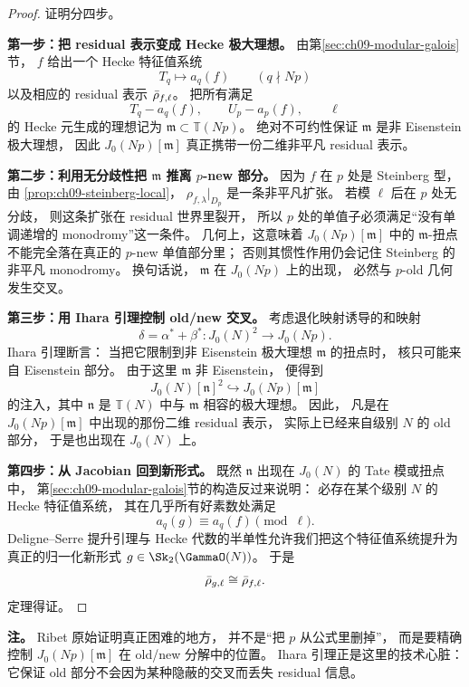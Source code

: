 \begin{proof}
证明分四步。

\textbf{第一步：把 residual 表示变成 Hecke 极大理想。}
由第\ref{sec:ch09-modular-galois}节，
$f$ 给出一个 Hecke 特征值系统
\[
  T_q\mapsto a_q(f)
  \qquad (q\nmid Np)
\]
以及相应的 residual 表示 $\bar{\rho}_{f,\ell}$。
把所有满足
\[
  T_q-a_q(f),\qquad U_p-a_p(f),\qquad \ell
\]
的 Hecke 元生成的理想记为 $\mathfrak m\subset \mathbb T(Np)$。
绝对不可约性保证 $\mathfrak m$ 是非 Eisenstein 极大理想，
因此 $J_0(Np)[\mathfrak m]$ 真正携带一份二维非平凡 residual 表示。

\textbf{第二步：利用无分歧性把 $\mathfrak m$ 推离 $p$-new 部分。}
因为 $f$ 在 $p$ 处是 Steinberg 型，
由 \cref{prop:ch09-steinberg-local}，
$\rho_{f,\lambda}|_{D_p}$ 是一条非平凡扩张。
若模 $\ell$ 后在 $p$ 处无分歧，
则这条扩张在 residual 世界里裂开，
所以 $p$ 处的单值子必须满足“没有单调递增的 monodromy”这一条件。
几何上，这意味着 $J_0(Np)[\mathfrak m]$ 中的 $\mathfrak m$-扭点不能完全落在真正的 $p$-new 单值部分里；
否则其惯性作用仍会记住 Steinberg 的非平凡 monodromy。
换句话说，
$\mathfrak m$ 在 $J_0(Np)$ 上的出现，
必然与 $p$-old 几何发生交叉。

\textbf{第三步：用 Ihara 引理控制 old/new 交叉。}
考虑退化映射诱导的和映射
\[
  \delta=\alpha^*+\beta^*\colon J_0(N)^2\to J_0(Np).
\]
Ihara 引理断言：
当把它限制到非 Eisenstein 极大理想 $\mathfrak m$ 的扭点时，
核只可能来自 Eisenstein 部分。
由于这里 $\mathfrak m$ 非 Eisenstein，
便得到
\[
  J_0(N)[\mathfrak n]^2\hookrightarrow J_0(Np)[\mathfrak m]
\]
的注入，其中 $\mathfrak n$ 是 $\mathbb T(N)$ 中与 $\mathfrak m$ 相容的极大理想。
因此，
凡是在 $J_0(Np)[\mathfrak m]$ 中出现的那份二维 residual 表示，
实际上已经来自级别 $N$ 的 old 部分，
于是也出现在 $J_0(N)$ 上。

\textbf{第四步：从 Jacobian 回到新形式。}
既然 $\mathfrak n$ 出现在 $J_0(N)$ 的 Tate 模或扭点中，
第\ref{sec:ch09-modular-galois}节的构造反过来说明：
必存在某个级别 $N$ 的 Hecke 特征值系统，
其在几乎所有好素数处满足
\[
  a_q(g)\equiv a_q(f)\pmod \ell.
\]
Deligne--Serre 提升引理与 Hecke 代数的半单性允许我们把这个特征值系统提升为真正的归一化新形式 $g\in \Sk_2(\GammaO(N))$。
于是
\[
  \bar{\rho}_{g,\ell}\cong \bar{\rho}_{f,\ell}.
\]
定理得证。
\end{proof}

\textbf{注。}
Ribet 原始证明真正困难的地方，
并不是“把 $p$ 从公式里删掉”，
而是要精确控制 $J_0(Np)[\mathfrak m]$ 在 old/new 分解中的位置。
Ihara 引理正是这里的技术心脏：
它保证 old 部分不会因为某种隐蔽的交叉而丢失 residual 信息。

